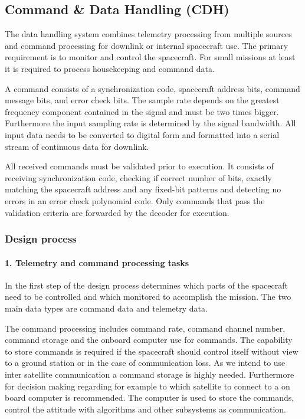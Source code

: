 \subsection{Command \& Data Handling (CDH)}

The data handling system combines telemetry processing from multiple sources and
command processing for downlink or internal spacecraft use. The primary requirement
is to monitor and control the spacecraft. For small missions at least it is
required to process housekeeping and command data.

A command consists of a synchronization code, spacecraft address bits, command
message bits, and error check bits. The sample rate depends on the greatest
frequency component contained in the signal and must be two times bigger.
Furthermore the input sampling rate is determined by the signal bandwidth.
All input data needs to be converted to digital form and formatted into a
serial stream of continuous data for downlink.

All received commands must be validated prior to execution. It consists of
receiving synchronization code, checking if correct number of bits, exactly
matching the spacecraft address and any fixed-bit patterns and detecting no errors
in an error check polynomial code. Only commands that pass the validation criteria
are forwarded by the decoder for execution.

\subsubsection{Design process}

\paragraph{1. Telemetry and command processing tasks}
In the first step of the design process determines which parts of the spacecraft need to be controlled and which monitored to accomplish the mission. The two main data types are command data and telemetry data.

The command processing includes command rate, command channel number, command storage and the onboard computer use for commands. The capability to store commands is required if the spacecraft should control itself without view to a ground station or in the case of communication loss. As we intend to use inter satellite communication a command storage is highly needed. Furthermore for decision making regarding for example to which satellite to connect to a on board computer is recommended. The computer is used to store the commands, control the attitude with algorithms and other subsystems as communication.

